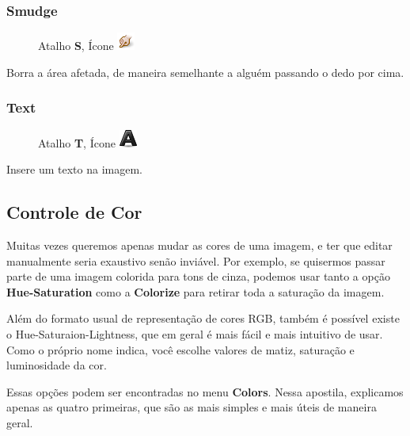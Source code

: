 \documentclass[12pt,onecolumn]{article}
\begin{document}
    \subsubsection{Smudge}
      \begin{figure}[H]
        Atalho {\bf S}, Ícone
        \includegraphics{gimp-icons/stock-tool-smudge-22.png}
        \label{fig:smudge}
      \end{figure}
      Borra a área afetada, de maneira semelhante a alguém passando o dedo por cima.
      
    \subsubsection{Text}
      \begin{figure}[H]
        Atalho {\bf T}, Ícone
        \includegraphics{gimp-icons/stock-tool-text-22.png}
        \label{fig:text}
      \end{figure}
      Insere um texto na imagem.

  \subsection{Controle de Cor}
  \label{sec:color_control}
  
    Muitas vezes queremos apenas mudar as cores de uma imagem, e ter que editar
    manualmente seria exaustivo senão inviável. Por exemplo, se quisermos passar
    parte de uma imagem colorida para tons de cinza, podemos usar tanto a opção
    {\bf Hue-Saturation} como a {\bf Colorize} para retirar toda a saturação da
    imagem.
    
    \begin{framed}
      Além do formato usual de representação de cores RGB, também é possível
      existe o Hue-Saturaion-Lightness, que em geral é mais fácil e mais
      intuitivo de usar. Como o próprio nome indica, você escolhe valores de
      matiz, saturação e luminosidade da cor.
    \end{framed}
    
    Essas opções podem ser encontradas no menu {\bf Colors}. Nessa apostila,
    explicamos apenas as quatro primeiras, que são as mais simples e mais úteis
    de maneira geral.
    
\end{document}

